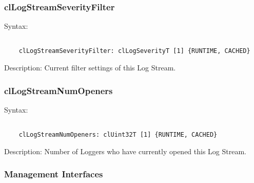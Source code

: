 \begin{flushleft}
\subsubsection{clLogStreamSeverityFilter}
\begin{Desc}
\item[Syntax:]
\footnotesize\begin{verbatim}        	

	clLogStreamSeverityFilter: clLogSeverityT [1] {RUNTIME, CACHED}
	\end{verbatim}
	\normalsize
\end{Desc}

\begin{Desc}
 \item[Description:]
Current filter settings of this Log Stream.
\end{Desc}


\subsubsection{clLogStreamNumOpeners}
\begin{Desc}
\item[Syntax:]
\footnotesize\begin{verbatim}        	

	clLogStreamNumOpeners: clUint32T [1] {RUNTIME, CACHED}
	\end{verbatim}
	\normalsize
\end{Desc}

\begin{Desc}
 \item[Description:]
Number of Loggers who have currently opened this Log Stream.
\end{Desc}


\subsubsection{Management Interfaces}


\end{flushleft}
